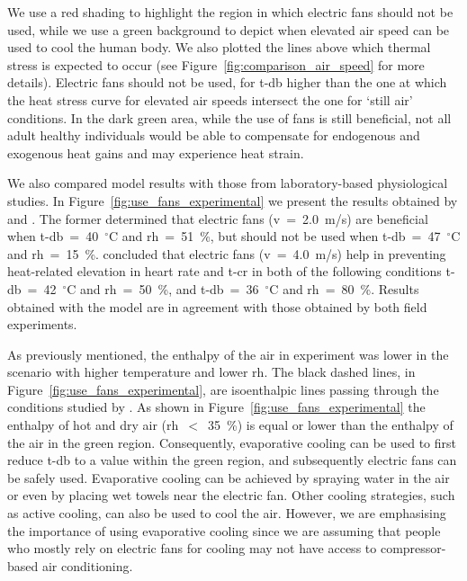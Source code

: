 We use a red shading to highlight the region in which electric fans should not be used, while we use a green background to depict when elevated air speed can be used to cool the human body.
We also plotted the lines above which thermal stress is expected to occur (see Figure~\ref{fig:comparison_air_speed} for more details).
Electric fans should not be used, for \ac{t-db} higher than the one at which the heat stress curve for elevated air speeds intersect the one for `still air' conditions.
In the dark green area, while the use of fans is still beneficial, not all adult healthy individuals would be able to compensate for endogenous and exogenous heat gains and may experience heat strain.

We also compared  model results with those from laboratory-based physiological studies.
In Figure~\ref{fig:use_fans_experimental} we present the results obtained by  and .
The former determined that electric fans (\ac{v}~=~2.0~m/s) are beneficial when \ac{t-db}~=~40~$^{\circ}$C and \ac{rh}~=~51~\%, but should not be used when \ac{t-db}~=~47~$^{\circ}$C and \ac{rh}~=~15~\%.
 concluded that electric fans (\ac{v}~=~4.0~m/s) help in preventing heat-related elevation in heart rate and \ac{t-cr} in both of the following conditions \ac{t-db}~=~42~$^{\circ}$C and \ac{rh}~=~50~\%, and \ac{t-db}~=~36~$^{\circ}$C and \ac{rh}~=~80~\%.
Results obtained with the  model are in agreement with those obtained by both field experiments.

As previously mentioned, the enthalpy of the air in  experiment was lower in the scenario with higher temperature and lower \ac{rh}.
The black dashed lines, in Figure~\ref{fig:use_fans_experimental}, are isoenthalpic lines passing through the conditions studied by .
As shown in Figure~\ref{fig:use_fans_experimental} the enthalpy of hot and dry air (\ac{rh}~$<$~35~\%) is equal or lower than the enthalpy of the air in the green region.
Consequently, evaporative cooling can be used to first reduce \ac{t-db} to a value within the green region, and subsequently electric fans can be safely used.
Evaporative cooling can be achieved by spraying water in the air or even by placing wet towels near the electric fan.
Other cooling strategies, such as active cooling, can also be used to cool the air.
However, we are emphasising the importance of using evaporative cooling since we are assuming that people who mostly rely on electric fans for cooling may not have access to compressor-based air conditioning.

